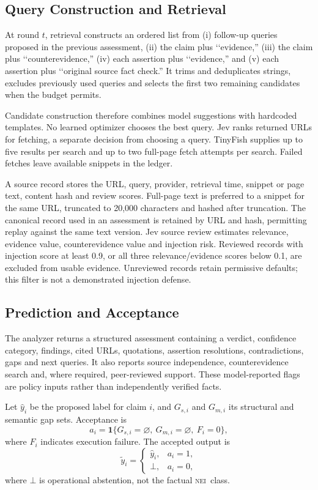 \documentclass[conference]{IEEEtran}
\newcommand{\NEI}{\textsc{nei}}
\begin{document}
\subsection{Query Construction and Retrieval}
At round $t$, retrieval constructs an ordered list from (i) follow-up queries proposed in the previous assessment, (ii) the claim plus \lq\lq evidence,'' (iii) the claim plus \lq\lq counterevidence,'' (iv) each assertion plus \lq\lq evidence,'' and (v) each assertion plus \lq\lq original source fact check.'' It trims and deduplicates strings, excludes previously used queries and selects the first two remaining candidates when the budget permits.

Candidate construction therefore combines model suggestions with hardcoded templates. No learned optimizer chooses the best query. Jev ranks returned URLs for fetching, a separate decision from choosing a query. TinyFish supplies up to five results per search and up to two full-page fetch attempts per search. Failed fetches leave available snippets in the ledger.

A source record stores the URL, query, provider, retrieval time, snippet or page text, content hash and review scores. Full-page text is preferred to a snippet for the same URL, truncated to 20,000 characters and hashed after truncation. The canonical record used in an assessment is retained by URL and hash, permitting replay against the same text version. Jev source review estimates relevance, evidence value, counterevidence value and injection risk. Reviewed records with injection score at least 0.9, or all three relevance/evidence scores below 0.1, are excluded from usable evidence. Unreviewed records retain permissive defaults; this filter is not a demonstrated injection defense.

\subsection{Prediction and Acceptance}
The analyzer returns a structured assessment containing a verdict, confidence category, findings, cited URLs, quotations, assertion resolutions, contradictions, gaps and next queries. It also reports source independence, counterevidence search and, where required, peer-reviewed support. These model-reported flags are policy inputs rather than independently verified facts.

Let $\hat y_i$ be the proposed label for claim $i$, and $G_{s,i}$ and $G_{m,i}$ its structural and semantic gap sets. Acceptance is
\begin{equation}
a_i=\mathbf{1}\{G_{s,i}=\varnothing,\ G_{m,i}=\varnothing,\ F_i=0\},
\label{eq:acceptance}
\end{equation}
where $F_i$ indicates execution failure. The accepted output is
\begin{equation}
\tilde y_i =
\begin{cases}
\hat y_i, & a_i=1,\\
\bot, & a_i=0,
\end{cases}
\label{eq:selective}
\end{equation}
where $\bot$ is operational abstention, not the factual \NEI\ class.
\end{document}
